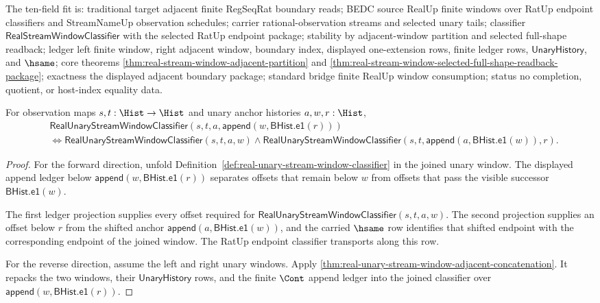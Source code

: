 The ten-field fit is: traditional target adjacent finite RegSeqRat boundary
reads; BEDC source RealUp finite windows over RatUp endpoint classifiers and
StreamNameUp observation schedules; carrier rational-observation streams and
selected unary tails; classifier $\mathsf{RealStreamWindowClassifier}$ with
the selected RatUp endpoint package; stability by adjacent-window partition
and selected full-shape readback; ledger left finite window, right adjacent
window, boundary index, displayed one-extension rows, finite ledger rows,
$\mathsf{UnaryHistory}$, and $\hsame$; core theorems
\autoref{thm:real-stream-window-adjacent-partition} and
\autoref{thm:real-stream-window-selected-full-shape-readback-package};
exactness the displayed adjacent boundary package; standard bridge finite
RealUp window consumption; status no completion, quotient, or host-index
equality data.

\begin{theorem}
\label{thm:real-unary-stream-window-adjacent-partition}
For observation maps $s,t:\Hist\to\Hist$ and unary anchor histories
$a,w,r:\Hist$,
$$
\begin{aligned}
&
\mathsf{RealUnaryStreamWindowClassifier}
(s,t,a,\mathsf{append}(w,\mathsf{BHist.e1}(r)))
\\
&\Longleftrightarrow
\mathsf{RealUnaryStreamWindowClassifier}(s,t,a,w)\land
\mathsf{RealUnaryStreamWindowClassifier}
(s,t,\mathsf{append}(a,\mathsf{BHist.e1}(w)),r).
\end{aligned}
$$
\end{theorem}
\begin{proof}
For the forward direction, unfold
Definition~\ref{def:real-unary-stream-window-classifier} in the joined unary
window. The displayed append ledger below
$\mathsf{append}(w,\mathsf{BHist.e1}(r))$ separates offsets that remain below
$w$ from offsets that pass the visible successor
$\mathsf{BHist.e1}(w)$.

The first ledger projection supplies every offset required for
$\mathsf{RealUnaryStreamWindowClassifier}(s,t,a,w)$. The second projection
supplies an offset below $r$ from the shifted anchor
$\mathsf{append}(a,\mathsf{BHist.e1}(w))$, and the carried $\hsame$ row
identifies that shifted endpoint with the corresponding endpoint of the joined
window. The RatUp endpoint classifier transports along this row.

For the reverse direction, assume the left and right unary windows. Apply
\autoref{thm:real-unary-stream-window-adjacent-concatenation}. It repacks the
two windows, their $\mathsf{UnaryHistory}$ rows, and the finite $\Cont$ append
ledger into the joined classifier over
$\mathsf{append}(w,\mathsf{BHist.e1}(r))$.
\end{proof}

